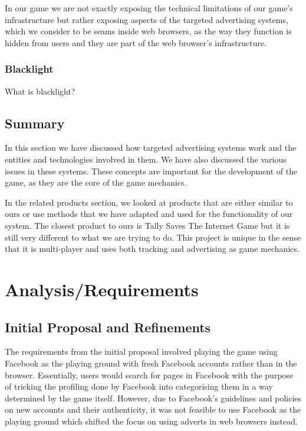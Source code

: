 \documentclass{l4proj}
\begin{document}
In our game we are not exactly exposing the technical limitations of our game's infrastructure but rather exposing aspects of the targeted advertising systems, which we consider to be seams inside web browsers, as the way they function is hidden from users and they are part of the web browser's infrastructure.

\subsection{Blacklight}
What is blacklight?

\section{Summary}
In this section we have discussed how targeted advertising systems work and the entities and technologies involved in them. We have also discussed the various issues in these systems. These concepts are important for the development of the game, as they are the core of the game mechanics. 

In the related products section, we looked at products that are either similar to ours or use methods that we have adapted and used for the functionality of our system. The closest product to ours is Tally Saves The Internet Game but it is still very different to what we are trying to do. This project is unique in the sense that it is multi-player and uses both tracking and advertising as game mechanics. 

\chapter{Analysis/Requirements}

\section{Initial Proposal and Refinements}
The requirements from the initial proposal involved playing the game using Facebook as the playing ground with fresh Facebook accounts rather than in the browser. Essentially, users would search for pages in Facebook with the purpose of tricking the profiling done by Facebook into categorising them in a way determined by the game itself. However, due to Facebook's guidelines and policies on new accounts and their authenticity, it was not feasible to use Facebook as the playing ground which shifted the focus on using adverts in web browsers instead.
\end{document}

